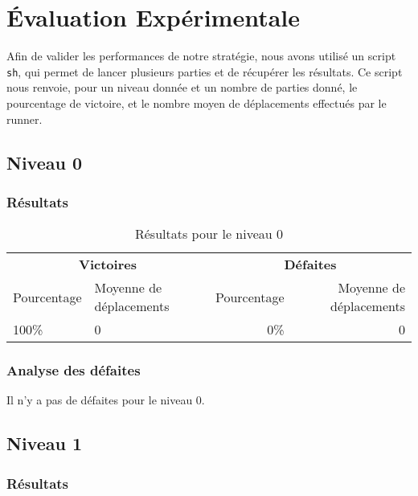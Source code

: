 \chapter{Évaluation Expérimentale}
\label{cp:evaluation}

Afin de valider les performances de notre stratégie, nous avons utilisé un script \texttt{sh}, qui permet de lancer plusieurs parties et de récupérer les résultats.
Ce script nous renvoie, pour un niveau donnée et un nombre de parties donné, le pourcentage de victoire, et le nombre moyen de déplacements effectués par le runner.

\section{Niveau 0}

\subsection{Résultats}

\begin{table}[!htpb]
    \begin{tabularx}{\textwidth}{lXrr}
        \toprule
        \multicolumn{2}{c}{\textbf{Victoires}} & \multicolumn{2}{c}{\textbf{Défaites}} \\
        \cmidrule(lr){1-2} \cmidrule(lr){3-4}
        Pourcentage & Moyenne de déplacements & Pourcentage & Moyenne de déplacements \\
        \midrule
        100\% & 0 & 0\% & 0 \\
        \bottomrule
    \end{tabularx}
    \caption{Résultats pour le niveau 0}
    \label{tab:res-niveau-0}
\end{table}

\subsection{Analyse des défaites}

Il n'y a pas de défaites pour le niveau 0.

\section{Niveau 1}

\subsection{Résultats}

